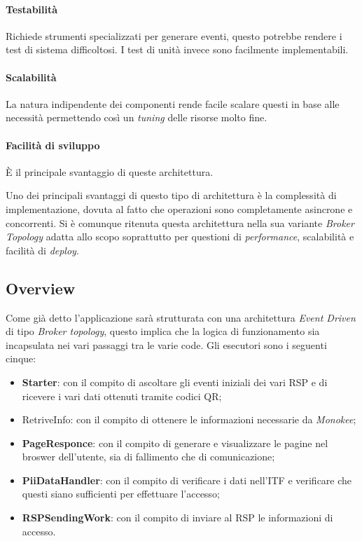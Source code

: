 \paragraph{Testabilità}
Richiede strumenti specializzati per generare eventi, questo potrebbe rendere i test di sistema difficoltosi. I test di unità invece sono facilmente implementabili. 
\paragraph{Scalabilità}
La natura indipendente dei componenti rende facile scalare questi in base alle necessità permettendo così un \emph{tuning} delle risorse molto fine.
\paragraph{Facilità di sviluppo }
È il principale svantaggio di queste architettura.


Uno dei principali svantaggi di questo tipo di architettura è la complessità di implementazione, dovuta al fatto che operazioni sono completamente asincrone e concorrenti. Si è comunque ritenuta questa architettura nella sua variante \emph{Broker Topology} adatta allo scopo soprattutto per questioni di \emph{performance}, scalabilità e facilità di \emph{deploy}.

\subsection{Overview}
Come già detto l’applicazione sarà strutturata con una architettura \emph{Event Driven} di tipo \emph{Broker topology}, questo implica che la logica di funzionamento sia incapsulata nei vari passaggi tra le varie code.
Gli esecutori sono i seguenti cinque:
\begin{itemize}
    \item \textbf{Starter}: con il compito di ascoltare gli eventi iniziali dei vari RSP e di ricevere i vari dati ottenuti tramite codici QR;
    \item RetriveInfo: con il compito di ottenere le informazioni necessarie da \emph{Monokee};
    \item \textbf{PageResponce}: con il compito di generare e visualizzare le pagine nel broswer dell’utente, sia di fallimento che di comunicazione;
    \item \textbf{PiiDataHandler}: con il compito di verificare i dati nell’ITF e verificare che questi siano sufficienti per effettuare l’accesso;
    \item \textbf{RSPSendingWork}: con il compito di inviare al RSP le informazioni di accesso.
\end{itemize}
    
